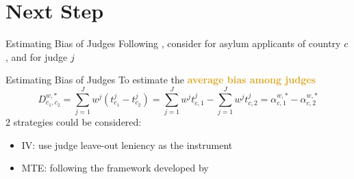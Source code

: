 \section{Next Step}
\frame{\sectionpage}

\begin{frame}{Estimating Bias of Judges}
    Following \citet{arnold2018racial}, consider for asylum applicants of country $c$, and for judge $j$
    
\end{frame}

\begin{frame}{Estimating Bias of Judges}
    To estimate the \textcolor{goldenrod}{\textbf{average bias among judges }}
    $$
    D^{w,*}_{c_1,c_2}  = \sum^J_{j=1}w^j\left(t_{c_1}^j-t_{c_2}^j\right) = \sum^J_{j=1}w^jt^j_{c,1}-\sum^J_{j=1}w^jt^j_{c,2}= \alpha^{w,*}_{c,1}- \alpha^{w,*}_{c,2}
    $$
    2 strategies could be considered:
    \begin{itemize}
        \item<+-> IV: use judge leave-out leniency as the instrument
        \item<+-> MTE: following the framework developed by \citet{heckman2005structural}
    \end{itemize}
    
\end{frame}

